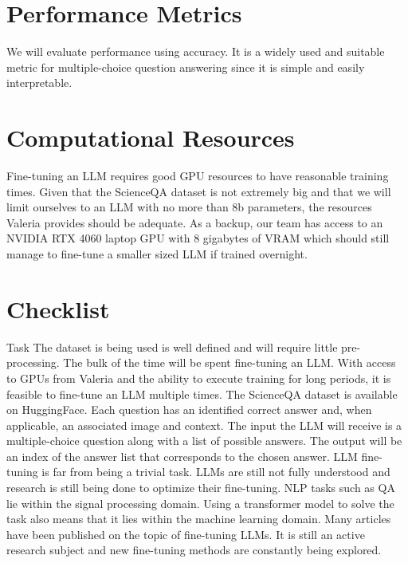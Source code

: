 \documentclass[11pt]{article} %
\begin{document}
\section*{Performance Metrics}
We will evaluate performance using accuracy. It is a widely used and suitable metric for multiple-choice question answering since it is simple and easily interpretable.

\section*{Computational Resources}
Fine-tuning an LLM requires good GPU resources to have reasonable training times. Given that the ScienceQA dataset is not extremely big and that we will limit ourselves to an LLM with no more than 8b parameters, the resources Valeria provides should be adequate. As a backup, our team has access to an NVIDIA RTX 4060 laptop GPU with 8 gigabytes of VRAM which should still manage to fine-tune a smaller sized LLM if trained overnight. 

\section*{Checklist}
\begin{CheckList}{Task}
     The dataset is being used is well defined and will require little pre-processing. The bulk of the time will be spent fine-tuning an LLM. With access to GPUs from Valeria and the ability to execute training for long periods, it is feasible to fine-tune an LLM multiple times.
     The ScienceQA dataset is available on HuggingFace. Each question has an identified correct answer and, when applicable, an associated image and context.
     The input the LLM will receive is a multiple-choice question along with a list of possible answers. The output will be an index of the answer list that corresponds to the chosen answer.
     LLM fine-tuning is far from being a trivial task. LLMs are still not fully understood and research is still being done to optimize their fine-tuning. 
     NLP tasks such as QA lie within the signal processing domain. Using a transformer model to solve the task also means that it lies within the machine learning domain.
     Many articles have been published on the topic of fine-tuning LLMs. It is still an active research subject and new fine-tuning methods are constantly being explored.
\end{CheckList}
\end{document}
